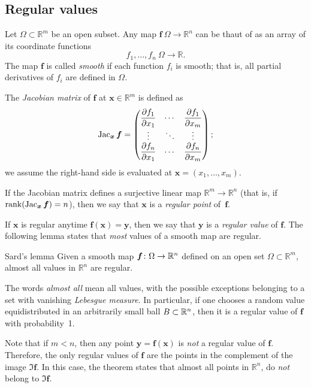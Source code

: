 \begin{multicols}{2}
{\subsection*{Regular values}

Let $\Omega\subset \mathbb{R}^m$ be an open subset.
Any map $\bm{f}\:\Omega\to\mathbb{R}^n$ can be thaut of as an array of its coordinate functions
\[f_1,\dots,f_n\:\Omega\to \mathbb{R}.\]
The map $\bm{f}$ is called \emph{smooth} if each function $f_i$ is smooth;
that is, all partial derivatives of $f_i$ are defined in $\Omega$.

The \emph{Jacobian matrix} of $\bm{f}$ at $\bm{x}\in\mathbb{R}^m$ is defined as 
\[\mathop{\rm Jac}\nolimits_{\bm{x}}\bm{f}=
\begin{pmatrix}
\dfrac{\partial f_1}{\partial x_1} & \cdots & \dfrac{\partial f_1}{\partial x_m}\\
\vdots & \ddots & \vdots\\
\dfrac{\partial f_n}{\partial x_1} & \cdots & \dfrac{\partial f_n}{\partial x_m} \end{pmatrix};\]
we assume the right-hand side is evaluated at $\bm{x}=(x_1,\dots,x_m)$.

If the Jacobian matrix defines a surjective linear map $\mathbb{R}^m\to\mathbb{R}^n$ (that is, if $\mathop{\rm rank}\nolimits(\mathop{\rm Jac}\nolimits_{\bm{x}}\bm{f})=n$), then we say that 
$\bm{x}$ is a \emph{regular point} of~$\bm{f}$.

If $\bm{x}$ is regular anytime $\bm{f}(\bm{x})=\bm{y}$,
then we say that $\bm{y}$ is a \emph{regular value} of $\bm{f}$.
The following lemma states that \textit{most} values of a smooth map are regular.

\begin{thm}{Sard's lemma}\label{lem:sard}
Given a smooth map $\bm{f}\colon \Omega \z\to \mathbb{R}^n$ defined on an open set $\Omega\subset \mathbb{R}^m$, almost all values in $\mathbb{R}^n$ are regular.
\end{thm}

The words \emph{almost all} mean all values, with the possible exceptions belonging to a set with vanishing {}\emph{Lebesgue measure}.
In particular, if one chooses a random value equidistributed in an arbitrarily small ball $B\z\subset \mathbb{R}^n$, then it is a regular value of $\bm{f}$ with probability~1.

Note that if $m<n$, then any point $\bm{y}=\bm{f}(\bm{x})$ is \emph{not} a regular value of $\bm{f}$.
Therefore, the only regular values of $\bm{f}$ are the points in the complement of the image $\Im \bm{f}$.
In this case, the theorem states that almost all points in $\mathbb{R}^n$, do \textit{not} belong to $\Im \bm{f}$.


}
\end{multicols}
